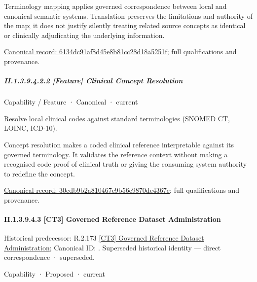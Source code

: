 Terminology mapping applies governed correspondence between local and canonical semantic systems. Translation preserves the limitations and authority of the map; it does not justify silently treating related source concepts as identical or clinically adjudicating the underlying information.


{\footnotesize \href{../../../../continuum/strategy/capability/feature/6134dc91af8d45e8b81cc28d18a5251f.md}{Canonical record: 6134dc91af8d45e8b81cc28d18a5251f}; full qualifications and provenance.}\par
\subparagraph*{II.1.3.9.4.2.2 [Feature] Clinical Concept Resolution}
\label{navigation:II.1.3.9.4.2.2}

\label{element:30cdb9b2a810467c9b56e9870de4367e}
{\small Capability / Feature · Canonical · current}\par

Resolve local clinical codes against standard terminologies (SNOMED CT, LOINC, ICD-10).



Concept resolution makes a coded clinical reference interpretable against its governed terminology. It validates the reference context without making a recognised code proof of clinical truth or giving the consuming system authority to redefine the concept.


{\footnotesize \href{../../../../continuum/strategy/capability/feature/30cdb9b2a810467c9b56e9870de4367e.md}{Canonical record: 30cdb9b2a810467c9b56e9870de4367e}; full qualifications and provenance.}\par
\paragraph*{II.1.3.9.4.3 [CT3] Governed Reference Dataset Administration}
\label{navigation:II.1.3.9.4.3}

{\small Historical predecessor: R.2.173 \hyperref[element:15d972931ed6447797c30a5ddb71737e]{[CT3] Governed Reference Dataset Administration}; Canonical ID: \texttt{}. Superseded historical identity — direct correspondence · superseded.}\par
\label{element:682b8684ad9e49d5a5c348a148081607}
{\small Capability · Proposed · current}\par

